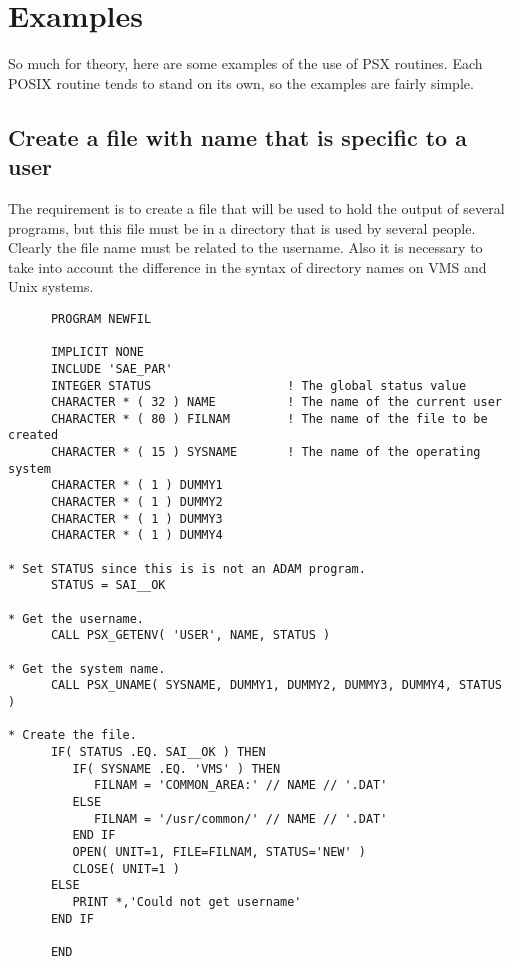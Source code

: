 \documentclass[twoside,11pt]{article}
\newcommand{\stardocinitials}  {SUN}
\newcommand{\stardocnumber}    {121.5}
\newcommand{\stardocname}{\stardocinitials /\stardocnumber}
\newcommand{\xlabel}[1]{}
\renewcommand{\_}{\texttt{\symbol{95}}}
\begin{document}
\newpage
\appendix

\section{\xlabel{examples}Examples}

So much for theory, here are some examples of the use of PSX routines. Each
POSIX routine tends to stand on its own, so the examples are fairly simple.

\subsection{\xlabel{create_a_file_with_name_that_is_specific_to_a_user}Create a file with name that is specific to a user}

The requirement is to create a file that will be used to hold the output of
several programs, but this file must be in a directory that is used by several
people. Clearly the file name must be related to the username. Also it is
necessary to take into account the difference in the syntax of directory names
on VMS and Unix systems.

\begin{small}
\begin{verbatim}
      PROGRAM NEWFIL

      IMPLICIT NONE
      INCLUDE 'SAE_PAR'
      INTEGER STATUS                   ! The global status value
      CHARACTER * ( 32 ) NAME          ! The name of the current user
      CHARACTER * ( 80 ) FILNAM        ! The name of the file to be created
      CHARACTER * ( 15 ) SYSNAME       ! The name of the operating system
      CHARACTER * ( 1 ) DUMMY1
      CHARACTER * ( 1 ) DUMMY2
      CHARACTER * ( 1 ) DUMMY3
      CHARACTER * ( 1 ) DUMMY4

* Set STATUS since this is is not an ADAM program.
      STATUS = SAI__OK

* Get the username.
      CALL PSX_GETENV( 'USER', NAME, STATUS )

* Get the system name.
      CALL PSX_UNAME( SYSNAME, DUMMY1, DUMMY2, DUMMY3, DUMMY4, STATUS )

* Create the file.
      IF( STATUS .EQ. SAI__OK ) THEN
         IF( SYSNAME .EQ. 'VMS' ) THEN
            FILNAM = 'COMMON_AREA:' // NAME // '.DAT'
         ELSE
            FILNAM = '/usr/common/' // NAME // '.DAT'
         END IF
         OPEN( UNIT=1, FILE=FILNAM, STATUS='NEW' )
         CLOSE( UNIT=1 )
      ELSE
         PRINT *,'Could not get username'
      END IF

      END
\end{verbatim}
\end{small}
\end{document}
